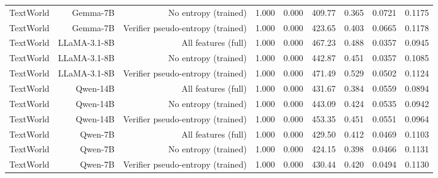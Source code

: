 \begin{table}[t]
\begin{tabular}{lrrrrrrrr}
TextWorld & Gemma-7B & No entropy (trained) & 1.000 & 0.000 & 409.77 & 0.365 & 0.0721 & 0.1175 \\
TextWorld & Gemma-7B & Verifier pseudo-entropy (trained) & 1.000 & 0.000 & 423.65 & 0.403 & 0.0665 & 0.1178 \\
TextWorld & LLaMA-3.1-8B & All features (full) & 1.000 & 0.000 & 467.23 & 0.488 & 0.0357 & 0.0945 \\
TextWorld & LLaMA-3.1-8B & No entropy (trained) & 1.000 & 0.000 & 442.87 & 0.451 & 0.0357 & 0.1085 \\
TextWorld & LLaMA-3.1-8B & Verifier pseudo-entropy (trained) & 1.000 & 0.000 & 471.49 & 0.529 & 0.0502 & 0.1124 \\
TextWorld & Qwen-14B & All features (full) & 1.000 & 0.000 & 431.67 & 0.384 & 0.0559 & 0.0894 \\
TextWorld & Qwen-14B & No entropy (trained) & 1.000 & 0.000 & 443.09 & 0.424 & 0.0535 & 0.0942 \\
TextWorld & Qwen-14B & Verifier pseudo-entropy (trained) & 1.000 & 0.000 & 453.35 & 0.451 & 0.0551 & 0.0964 \\
TextWorld & Qwen-7B & All features (full) & 1.000 & 0.000 & 429.50 & 0.412 & 0.0469 & 0.1103 \\
TextWorld & Qwen-7B & No entropy (trained) & 1.000 & 0.000 & 424.15 & 0.398 & 0.0466 & 0.1131 \\
TextWorld & Qwen-7B & Verifier pseudo-entropy (trained) & 1.000 & 0.000 & 430.44 & 0.420 & 0.0494 & 0.1130 \\
\hline
\end{tabular}
\end{table}
